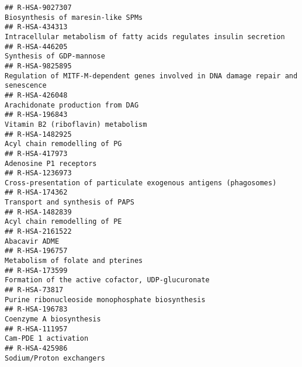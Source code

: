 \documentclass[
]{article}
\begin{document}
\begin{verbatim}
## R-HSA-9027307                                                                                                    Biosynthesis of maresin-like SPMs
## R-HSA-434313                                                                   Intracellular metabolism of fatty acids regulates insulin secretion
## R-HSA-446205                                                                                                              Synthesis of GDP-mannose
## R-HSA-9825895                                                    Regulation of MITF-M-dependent genes involved in DNA damage repair and senescence
## R-HSA-426048                                                                                                      Arachidonate production from DAG
## R-HSA-196843                                                                                                    Vitamin B2 (riboflavin) metabolism
## R-HSA-1482925                                                                                                         Acyl chain remodelling of PG
## R-HSA-417973                                                                                                                Adenosine P1 receptors
## R-HSA-1236973                                                                    Cross-presentation of particulate exogenous antigens (phagosomes)
## R-HSA-174362                                                                                                       Transport and synthesis of PAPS
## R-HSA-1482839                                                                                                         Acyl chain remodelling of PE
## R-HSA-2161522                                                                                                                        Abacavir ADME
## R-HSA-196757                                                                                                     Metabolism of folate and pterines
## R-HSA-173599                                                                                     Formation of the active cofactor, UDP-glucuronate
## R-HSA-73817                                                                                       Purine ribonucleoside monophosphate biosynthesis
## R-HSA-196783                                                                                                               Coenzyme A biosynthesis
## R-HSA-111957                                                                                                                  Cam-PDE 1 activation
## R-HSA-425986                                                                                                              Sodium/Proton exchangers

\end{verbatim}
\end{document}
